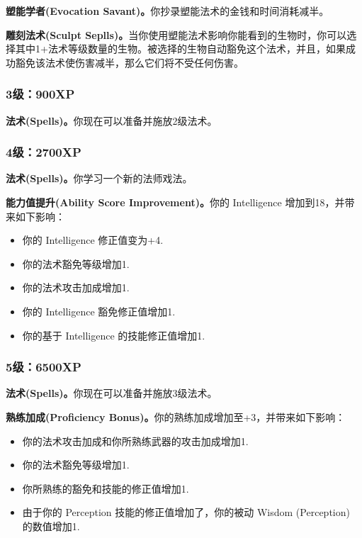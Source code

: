 \documentclass[letterpaper,twocolumn,openany,nodeprecatedcode]{dndbook}
\begin{document}
\textbf{塑能学者(Evocation Savant)。}你抄录塑能法术的金钱和时间消耗减半。

\textbf{雕刻法术(Sculpt Seplls)。}当你使用塑能法术影响你能看到的生物时，你可以选择其中1+法术等级数量的生物。被选择的生物自动豁免这个法术，并且，如果成功豁免该法术使伤害减半，那么它们将不受任何伤害。

\subsubsection{3级：900XP}
\textbf{法术(Spells)。}你现在可以准备并施放2级法术。

\subsubsection{4级：2700XP}
\textbf{法术(Spells)。}你学习一个新的法师戏法。

\textbf{能力值提升(Ability Score Improvement)。}你的 Intelligence 增加到18，并带来如下影响：
\begin{itemize}
\item 你的 Intelligence 修正值变为+4.
\item 你的法术豁免等级增加1.
\item 你的法术攻击加成增加1.
\item 你的 Intelligence 豁免修正值增加1.
\item 你的基于 Intelligence 的技能修正值增加1.
\end{itemize}

\subsubsection{5级：6500XP}
\textbf{法术(Spells)。}你现在可以准备并施放3级法术。

\textbf{熟练加成(Proficiency Bonus)。}你的熟练加成增加至+3，并带来如下影响：
\begin{itemize}
\item 你的法术攻击加成和你所熟练武器的攻击加成增加1.
\item 你的法术豁免等级增加1.
\item 你所熟练的豁免和技能的修正值增加1.
\item 由于你的 Perception 技能的修正值增加了，你的被动 Wisdom (Perception) 的数值增加1.
\end{itemize}


\end{document}
